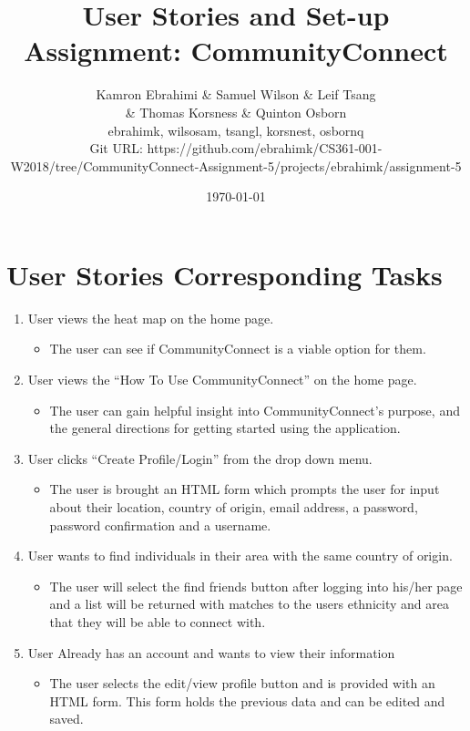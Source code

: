 \documentclass[12pt]{article}
\title{ User Stories and Set-up Assignment: CommunityConnect}
\author{Kamron Ebrahimi \& Samuel Wilson \& Leif Tsang \\ \& Thomas Korsness  \& Quinton Osborn \\ ebrahimk, wilsosam, tsangl, korsnest, osbornq \\ \scriptsize{Git URL: https://github.com/ebrahimk/CS361-001-W2018/tree/CommunityConnect-Assignment-5/projects/ebrahimk/assignment-5}}
\date{\today}
\begin{document}
\maketitle

\tableofcontents

\newpage
\section{\bf  User Stories Corresponding Tasks}
  \begin{enumerate}
    \item User views the heat map on the home page.
      \begin{itemize}
        \item The user can see if CommunityConnect is a viable option for them.
      \end{itemize}

    \item User views the “How To Use CommunityConnect” on the home page.
      \begin{itemize}
        \item The user can gain helpful insight into CommunityConnect’s purpose, and the general directions for getting started using the application.
      \end{itemize}

    \item User clicks “Create Profile/Login” from the drop down menu.
      \begin{itemize}
        \item The user is brought an HTML form which prompts the user for input about their location, country of origin, email address, a password, password confirmation and a username.
      \end{itemize}

    \item User wants to find individuals in their area with the same country of origin.
      \begin{itemize}
        \item The user will select the find friends button after logging into his/her page and a list will be returned with matches to the users ethnicity and area that they will be able to connect with.
      \end{itemize}

    \item User Already has an account and wants to view their information
      \begin{itemize}
        \item The user selects the edit/view profile button and is provided with an HTML form. This form holds the previous data and can be edited and saved.
      \end{itemize}


\end{enumerate}
\end{document}
